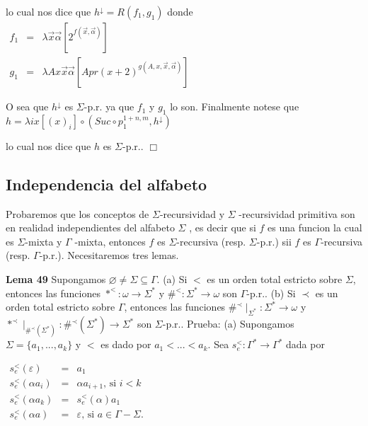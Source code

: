 lo cual nos dice que \(h^{\downarrow }=R(f_{1},g_{1})\) donde
\(\displaystyle \begin{array}{rcl} f_{1} & =& \lambda \vec{x}\vec{\alpha}\left[ 2^{f(\vec{x},\vec{\alpha})}\right] \\ g_{1} & =& \lambda Ax\vec{x}\vec{\alpha}\left[ Apr(x+2)^{g(A,x,\vec{x},\vec{ \alpha})}\right] \end{array} \)

O sea que \(h^{\downarrow }\) es \(\Sigma \)-p.r. ya que \(f_{1}\) y \(g_{1}\) lo son. Finalmente notese que
\(\displaystyle h=\lambda ix[(x)_{i}]\circ (Suc\circ p_{1}^{1+n,m},h^{\downarrow }) \)

lo cual nos dice que \(h\) es \(\Sigma \)-p.r.. \(\Box\)

\subsection{Independencia del alfabeto}

Probaremos que los conceptos de \(\Sigma \)-recursividad y \(\Sigma \) -recursividad primitiva son en realidad independientes del alfabeto \(\Sigma \) , es decir que si \(f\) es una funcion la cual es \(\Sigma \)-mixta y \(\Gamma \) -mixta, entonces \(f\) es \(\Sigma \)-recursiva (resp. \(\Sigma \)-p.r.) sii \(f\) es \(\Gamma \)-recursiva (resp. \(\Gamma \)-p.r.). Necesitaremos tres lemas.




\textbf{Lema 49} Supongamos \(\varnothing \neq \Sigma \subseteq \Gamma \).
(a) Si \(< \) es un orden total estricto sobre \(\Sigma \), entonces las funciones \(\ast ^{< }:\omega \rightarrow \Sigma ^{\ast }\) y \(\#^{< }:\Sigma ^{\ast }\rightarrow \omega \) son \(\Gamma \)-p.r..
(b) Si \(\prec \) es un orden total estricto sobre \(\Gamma \), entonces las funciones \(\#^{\prec }\mid _{\Sigma ^{\ast }}:\Sigma ^{\ast }\rightarrow \omega \) y \(\ast ^{\prec }\mid _{\#^{\prec }(\Sigma ^{\ast })}:\#^{\prec }(\Sigma ^{\ast })\rightarrow \Sigma ^{\ast }\) son \(\Sigma \)-p.r..
Prueba: (a) Supongamos \(\Sigma =\{a_{1},...,a_{k}\}\) y \(< \) es dado por \( a_{1}< ...< a_{k}\). Sea \(s_{e}^{< }:\Gamma ^{\ast }\rightarrow \Gamma ^{\ast }\) dada por

\(\displaystyle \begin{array}{rcl} s_{e}^{< }(\varepsilon ) & =& a_{1} \\ s_{e}^{< }(\alpha a_{i}) & =& \alpha a_{i+1}\text{, si }i< k \\ s_{e}^{< }(\alpha a_{k}) & =& s_{e}^{< }(\alpha )a_{1} \\ s_{e}^{< }(\alpha a) & =& \varepsilon \text{, si }a\in \Gamma -\Sigma . \end{array} \)

